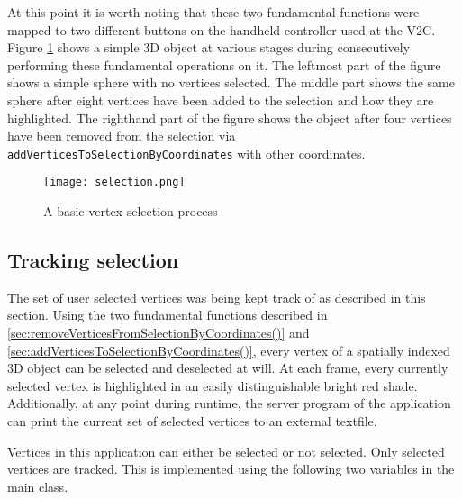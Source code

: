 At this point it is worth noting that these two fundamental functions were mapped to two different buttons on the handheld controller used at the V2C. Figure \ref{fig:selection.png} shows a simple 3D object at various stages during consecutively performing these fundamental operations on it. The leftmost part of the figure shows a simple sphere with no vertices selected. The middle part shows the same sphere after eight vertices have been added to the selection and how they are highlighted. The righthand part of the figure shows the object after four vertices have been removed from the selection via \texttt{addVerticesToSelectionByCoordinates} with other coordinates.

\begin{figure}[htb]
  \centering
  \texttt{[image: selection.png]}
  \caption{A basic vertex selection process}\label{fig:selection.png}
\end{figure}


\subsection{Tracking selection}
\label{sec:tracking_selection}

The set of user selected vertices was being kept track of as described in this section. Using the two fundamental functions described in \ref{sec:removeVerticesFromSelectionByCoordinates()} and \ref{sec:addVerticesToSelectionByCoordinates()}, every vertex of a spatially indexed 3D object can be selected and deselected at will. At each frame, every currently selected vertex is highlighted in an easily distinguishable bright red shade. Additionally, at any point during runtime, the server program of the application can print the current set of selected vertices to an external textfile.

Vertices in this application can either be selected or not selected. Only selected vertices are tracked. This is implemented using the following two variables in the main class.


